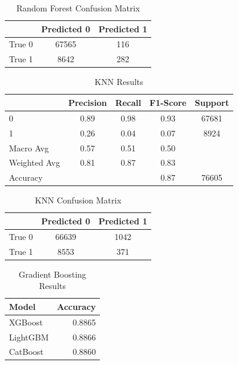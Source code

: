 \documentclass[12pt]{article}
\begin{document}
\begin{table}[htbp]
    \centering
    \caption{Random Forest Confusion Matrix}
    \begin{tabular}{lcc}
        \toprule
        & Predicted 0 & Predicted 1 \\
        \midrule
        True 0 & 67565 & 116 \\
        True 1 & 8642 & 282 \\
        \bottomrule
    \end{tabular}
\end{table}

\begin{table}[htbp]
    \centering
    \caption{KNN Results}
    \begin{tabular}{lcccc}
        \toprule
        & Precision & Recall & F1-Score & Support \\
        \midrule
        0 & 0.89 & 0.98 & 0.93 & 67681 \\
        1 & 0.26 & 0.04 & 0.07 & 8924 \\
        Macro Avg & 0.57 & 0.51 & 0.50 & \\
        Weighted Avg & 0.81 & 0.87 & 0.83 & \\
        \midrule
        Accuracy & & & 0.87 & 76605 \\
        \bottomrule
    \end{tabular}
\end{table}

\begin{table}[htbp]
    \centering
    \caption{KNN Confusion Matrix}
    \begin{tabular}{lcc}
        \toprule
        & Predicted 0 & Predicted 1 \\
        \midrule
        True 0 & 66639 & 1042 \\
        True 1 & 8553 & 371 \\
        \bottomrule
    \end{tabular}
\end{table}

\begin{table}[htbp]
    \centering
    \caption{Gradient Boosting Results}
    \begin{tabular}{lr}
        \toprule
        Model & Accuracy \\
        \midrule
        XGBoost & 0.8865 \\
        LightGBM & 0.8866 \\
        CatBoost & 0.8860 \\
        \bottomrule
    \end{tabular}
\end{table}
\end{document}
